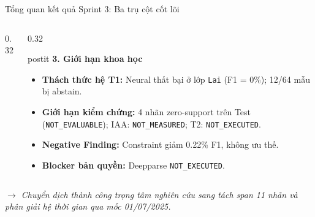\documentclass[aspectratio=169, 9pt]{beamer}
\begin{document}
\begin{frame}{Tổng quan kết quả Sprint 3: Ba trụ cột cốt lõi}
\begin{columns}[T]
\begin{column}{0.32\textwidth}
{\begin{itemize}
      \end{itemize}
      }
    \end{column}
    \begin{column}{0.32\textwidth}
      \begin{beamercolorbox}[wd=\textwidth,rounded=true,shadow=false]{postit}
        \textbf{\color{alertred}3. Giới hạn khoa học}
      \end{beamercolorbox}
      \vspace{0.05cm}
      {\fontsize{7.3pt}{9.2pt}\selectfont
      \begin{itemize}
        \setlength{\itemsep}{2pt}
        \item \textbf{Thách thức hệ T1:} Neural thất bại ở lớp \texttt{Lai} (F1 = 0\%); 12/64 mẫu bị abstain.
        \item \textbf{Giới hạn kiểm chứng:} 4 nhãn zero-support trên Test (\texttt{NOT\_EVALUABLE}); IAA: \texttt{NOT\_MEASURED}; T2: \texttt{NOT\_EXECUTED}.
        \item \textbf{Negative Finding:} Constraint giảm 0.22\% F1, không ưu thế.
        \item \textbf{Blocker bản quyền:} Deepparse \texttt{NOT\_EXECUTED}.
      \end{itemize}
      }
    \end{column}
  \end{columns}
  \vspace{0.12cm}
  \begin{center}
    {\fontsize{7.2pt}{9pt}\selectfont\textit{\color{bkblue} $\to$ Chuyển dịch thành công trọng tâm nghiên cứu sang tách span 11 nhãn và phân giải hệ thời gian qua mốc 01/07/2025.}}
  \end{center}
\end{frame}
\end{document}

